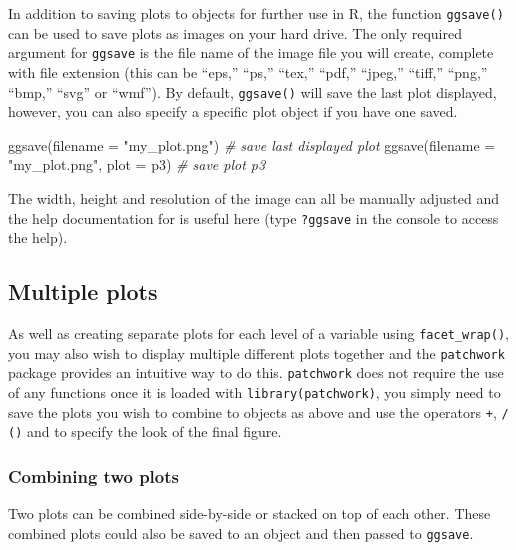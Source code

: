\documentclass[
  english,
  doc,floatsintext]{apa6}
\newenvironment{Shaded}{\begin{snugshade}}{\end{snugshade}}
\newcommand{\AttributeTok}[1]{\textcolor[rgb]{0.77,0.63,0.00}{#1}}
\newcommand{\CommentTok}[1]{\textcolor[rgb]{0.56,0.35,0.01}{\textit{#1}}}
\newcommand{\FunctionTok}[1]{\textcolor[rgb]{0.00,0.00,0.00}{#1}}
\newcommand{\NormalTok}[1]{#1}
\newcommand{\StringTok}[1]{\textcolor[rgb]{0.31,0.60,0.02}{#1}}
\begin{document}
In addition to saving plots to objects for further use in R, the function \texttt{ggsave()} can be used to save plots as images on your hard drive. The only required argument for \texttt{ggsave} is the file name of the image file you will create, complete with file extension (this can be ``eps,'' ``ps,'' ``tex,'' ``pdf,'' ``jpeg,'' ``tiff,'' ``png,'' ``bmp,'' ``svg'' or ``wmf''). By default, \texttt{ggsave()} will save the last plot displayed, however, you can also specify a specific plot object if you have one saved.

\begin{Shaded}
\begin{Highlighting}[]
\FunctionTok{ggsave}\NormalTok{(}\AttributeTok{filename =} \StringTok{"my\_plot.png"}\NormalTok{) }\CommentTok{\# save last displayed plot}
\FunctionTok{ggsave}\NormalTok{(}\AttributeTok{filename =} \StringTok{"my\_plot.png"}\NormalTok{, }\AttributeTok{plot =}\NormalTok{ p3) }\CommentTok{\# save plot p3}
\end{Highlighting}
\end{Shaded}

The width, height and resolution of the image can all be manually adjusted and the help documentation for is useful here (type \texttt{?ggsave} in the console to access the help).

\hypertarget{multiple-plots}{%
\subsection{Multiple plots}\label{multiple-plots}}

As well as creating separate plots for each level of a variable using \texttt{facet\_wrap()}, you may also wish to display multiple different plots together and the \texttt{patchwork} package provides an intuitive way to do this. \texttt{patchwork} does not require the use of any functions once it is loaded with \texttt{library(patchwork)}, you simply need to save the plots you wish to combine to objects as above and use the operators \texttt{+}, \texttt{/} \texttt{()} and \texttt{\textbar{}} to specify the look of the final figure.

\hypertarget{combining-two-plots}{%
\subsubsection{Combining two plots}\label{combining-two-plots}}

Two plots can be combined side-by-side or stacked on top of each other. These combined plots could also be saved to an object and then passed to \texttt{ggsave}.
\end{document}
